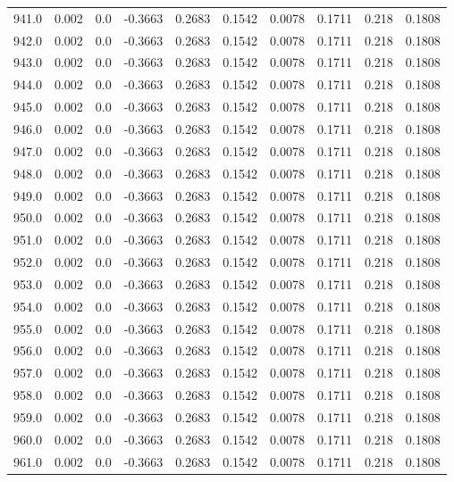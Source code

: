 \begin{longtable}{lrrrrrrrrr}
941.0 & 0.002 & 0.0 & -0.3663 & 0.2683 & 0.1542 & 0.0078 & 0.1711 & 0.218 & 0.1808 \\
942.0 & 0.002 & 0.0 & -0.3663 & 0.2683 & 0.1542 & 0.0078 & 0.1711 & 0.218 & 0.1808 \\
943.0 & 0.002 & 0.0 & -0.3663 & 0.2683 & 0.1542 & 0.0078 & 0.1711 & 0.218 & 0.1808 \\
944.0 & 0.002 & 0.0 & -0.3663 & 0.2683 & 0.1542 & 0.0078 & 0.1711 & 0.218 & 0.1808 \\
945.0 & 0.002 & 0.0 & -0.3663 & 0.2683 & 0.1542 & 0.0078 & 0.1711 & 0.218 & 0.1808 \\
946.0 & 0.002 & 0.0 & -0.3663 & 0.2683 & 0.1542 & 0.0078 & 0.1711 & 0.218 & 0.1808 \\
947.0 & 0.002 & 0.0 & -0.3663 & 0.2683 & 0.1542 & 0.0078 & 0.1711 & 0.218 & 0.1808 \\
948.0 & 0.002 & 0.0 & -0.3663 & 0.2683 & 0.1542 & 0.0078 & 0.1711 & 0.218 & 0.1808 \\
949.0 & 0.002 & 0.0 & -0.3663 & 0.2683 & 0.1542 & 0.0078 & 0.1711 & 0.218 & 0.1808 \\
950.0 & 0.002 & 0.0 & -0.3663 & 0.2683 & 0.1542 & 0.0078 & 0.1711 & 0.218 & 0.1808 \\
951.0 & 0.002 & 0.0 & -0.3663 & 0.2683 & 0.1542 & 0.0078 & 0.1711 & 0.218 & 0.1808 \\
952.0 & 0.002 & 0.0 & -0.3663 & 0.2683 & 0.1542 & 0.0078 & 0.1711 & 0.218 & 0.1808 \\
953.0 & 0.002 & 0.0 & -0.3663 & 0.2683 & 0.1542 & 0.0078 & 0.1711 & 0.218 & 0.1808 \\
954.0 & 0.002 & 0.0 & -0.3663 & 0.2683 & 0.1542 & 0.0078 & 0.1711 & 0.218 & 0.1808 \\
955.0 & 0.002 & 0.0 & -0.3663 & 0.2683 & 0.1542 & 0.0078 & 0.1711 & 0.218 & 0.1808 \\
956.0 & 0.002 & 0.0 & -0.3663 & 0.2683 & 0.1542 & 0.0078 & 0.1711 & 0.218 & 0.1808 \\
957.0 & 0.002 & 0.0 & -0.3663 & 0.2683 & 0.1542 & 0.0078 & 0.1711 & 0.218 & 0.1808 \\
958.0 & 0.002 & 0.0 & -0.3663 & 0.2683 & 0.1542 & 0.0078 & 0.1711 & 0.218 & 0.1808 \\
959.0 & 0.002 & 0.0 & -0.3663 & 0.2683 & 0.1542 & 0.0078 & 0.1711 & 0.218 & 0.1808 \\
960.0 & 0.002 & 0.0 & -0.3663 & 0.2683 & 0.1542 & 0.0078 & 0.1711 & 0.218 & 0.1808 \\
961.0 & 0.002 & 0.0 & -0.3663 & 0.2683 & 0.1542 & 0.0078 & 0.1711 & 0.218 & 0.1808 \\

\end{longtable}
